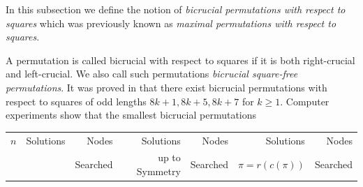 \documentclass[12pt,reqno]{article}
\begin{document}
In this subsection we define the notion of {\em bicrucial permutations with respect to squares} which was previously known \cite{AKPV}  as {\em maximal permutations with respect to squares}.  

A permutation is called bicrucial with respect to squares if it is both right-crucial and left-crucial.  We also call such permutations {\em bicrucial square-free permutations}. It was proved in \cite{AKPV}  that there exist bicrucial permutations with respect to
squares of odd lengths $8k+1, 8k+5, 8k+7$ for $k\ge 1$. Computer experiments show that the smallest bicrucial permutations \hfill\eject


\begin{table}[H]
\begin{center}
\footnotesize
\begin{tabular}{r|rr|rr|rr}
$n$ & Solutions & Nodes & Solutions  & Nodes & Solutions & Nodes \\ 
 &  & Searched &up to Symmetry & Searched & $\pi=r(c(\pi))$& Searched \\


\end{tabular}
\end{center}
\end{table}
\end{document}
